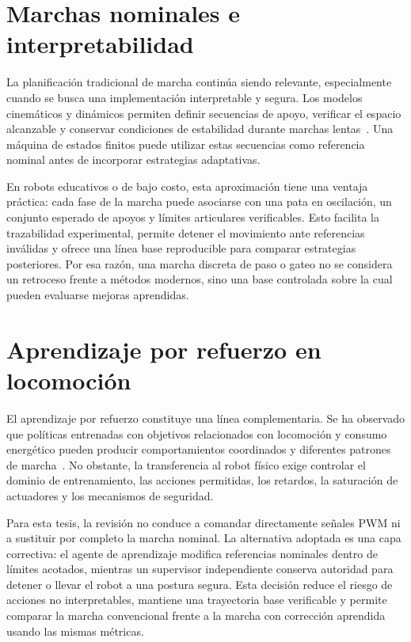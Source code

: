 \section{Marchas nominales e interpretabilidad}

La planificación tradicional de marcha continúa siendo relevante,
especialmente cuando se busca una implementación interpretable y segura. Los
modelos cinemáticos y dinámicos permiten definir secuencias de apoyo, verificar
el espacio alcanzable y conservar condiciones de estabilidad durante marchas
lentas~\cite{zamani2011dynamics}. Una máquina de estados finitos puede utilizar
estas secuencias como referencia nominal antes de incorporar estrategias
adaptativas.

En robots educativos o de bajo costo, esta aproximación tiene una ventaja
práctica: cada fase de la marcha puede asociarse con una pata en oscilación, un
conjunto esperado de apoyos y límites articulares verificables. Esto facilita la
trazabilidad experimental, permite detener el movimiento ante referencias
inválidas y ofrece una línea base reproducible para comparar estrategias
posteriores. Por esa razón, una marcha discreta de paso o gateo no se considera
un retroceso frente a métodos modernos, sino una base controlada sobre la cual
pueden evaluarse mejoras aprendidas.

\section{Aprendizaje por refuerzo en locomoción}

El aprendizaje por refuerzo constituye una línea complementaria. Se ha
observado que políticas entrenadas con objetivos relacionados con locomoción y
consumo energético pueden producir comportamientos coordinados y diferentes
patrones de marcha~\cite{heess2017emergence,fu2021energy}. No obstante, la
transferencia al robot físico exige controlar el dominio de entrenamiento, las
acciones permitidas, los retardos, la saturación de actuadores y los mecanismos
de seguridad.

Para esta tesis, la revisión no conduce a comandar directamente señales PWM ni
a sustituir por completo la marcha nominal. La alternativa adoptada es una capa
correctiva: el agente de aprendizaje modifica referencias nominales dentro de
límites acotados, mientras un supervisor independiente conserva autoridad para
detener o llevar el robot a una postura segura. Esta decisión reduce el riesgo
de acciones no interpretables, mantiene una trayectoria base verificable y
permite comparar la marcha convencional frente a la marcha con corrección
aprendida usando las mismas métricas.

